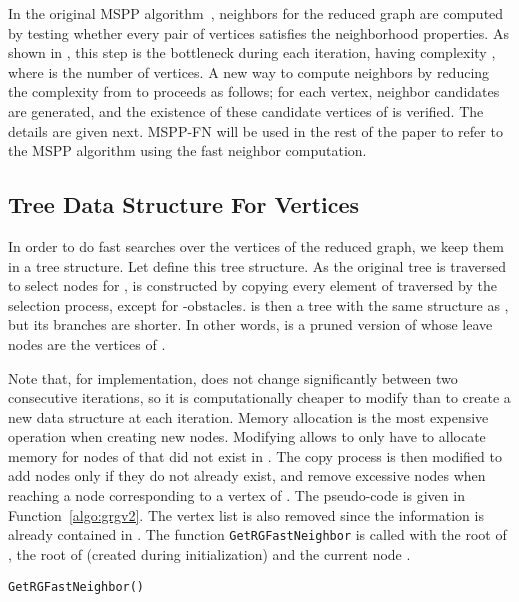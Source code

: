 \documentclass[letterpaper, 10 pt, conference]{ieeeconf}
\makeatletter
\theoremstyle{definition}
\newcounter{megaalgorithm}
\newenvironment{megaalgorithm}[1][htb]
  {\renewcommand{\algorithmcfname}{Function}\let\c@algocf\c@megaalgorithm \begin{algorithm}[#1]}{\end{algorithm}}
\makeatother
\begin{document}
In the original MSPP algorithm~\cite{hauer2015multi}, neighbors for the reduced graph are computed by testing whether every pair of vertices satisfies the neighborhood properties.
As shown in \cite{hauer2015multi}, this step is the bottleneck during each iteration, having complexity ,
where  is the number of vertices.
A new way to compute neighbors by reducing the complexity from  to  proceeds as follows; for each vertex, neighbor candidates are generated, and the existence of these candidate vertices of  is verified. The details are given next. MSPP-FN will be used in the rest of the paper to refer to the MSPP algorithm using the fast neighbor computation.

\subsection{Tree Data Structure For Vertices}

In order to do fast searches over the vertices of the reduced graph, we keep them in a tree structure.
Let  define this tree structure.
As the original tree  is traversed to select nodes for ,  is constructed by copying every element of  traversed by the selection process, except for -obstacles.
 is then a tree with the same structure as , but its branches are shorter.
In other words,  is a pruned version of  whose leave nodes are the vertices of .

Note that, for implementation,  does not change significantly between two consecutive iterations, so it is computationally cheaper to modify  than to create a new data structure at each iteration.
Memory allocation is the most expensive operation when creating new nodes.
Modifying  allows to only have to allocate memory for nodes of  that did not exist in .
The copy process is then modified to add nodes only if they do not already exist, and remove excessive nodes when reaching a node corresponding to a vertex of .
The pseudo-code is given in Function~\ref{algo:grgv2}.
The vertex list is also removed since the information is already contained in .
The function {\tt GetRGFastNeighbor} is called with the root of , the root of  (created during initialization) and the current node .

\begin{megaalgorithm}[ht]
\caption{\tt{GetRGFastNeighbor}()}
\label{algo:grgv2}
\end{megaalgorithm}
\end{document}
